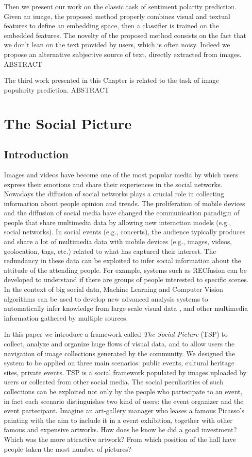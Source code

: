 Then we present our work on the classic task of sentiment polarity prediction. Given an image, the proposed method properly combines visual and textual features to define an embedding space, then a classifier is trained on the embedded features. The novelty of the proposed method consists on the fact that we don't lean on the text provided by users, which is often noisy. Indeed we propose an alternative subjective source of text, directly extracted from images.
ABSTRACT

The third work presented in this Chapter is related to the task of image popularity prediction.
ABSTRACT

\section{The Social Picture}
\subsection{Introduction}
Images and videos have become one of the most popular media by which users express their emotions and share their experiences in the social networks. Nowadays the diffusion of social networks plays a crucial role in collecting information about people opinion and trends.
The proliferation of mobile devices and the diffusion of social media have changed the communication paradigm of people that share multimedia data by allowing new interaction models (e.g., social networks). In social events (e.g., concerts), the audience typically produces and share a lot of multimedia data with mobile devices (e.g., images, videos, geolocation, tags, etc.) related to what has captured their interest. The redundancy in these data can be exploited to infer social information about the attitude of the attending people. For example, systems such as RECfusion \cite{Ortis2015n525} can be developed to understand if there are groups of people interested to specific scenes. In the context of big social data, Machine Learning and Computer Vision algorithms can be used to develop new advanced analysis systems to automatically infer knowledge from large scale visual data \cite{weyand2015visual}, and other multimedia information gathered by multiple sources.

In this paper we introduce a framework called \textit{The Social Picture} (TSP) to collect, analyze and organize huge flows of visual data, and to allow users the navigation of image collections generated by the community.
We designed the system to be applied on three main scenarios: public events, cultural heritage sites, private events. TSP is a social framework populated by images uploaded by users or collected from other social media. The social peculiarities of such collections can be exploited not only by the people who partecipate to an event, in fact each scenario distinguishes two kind of users: the event organizer and the event partecipant.
Imagine an art-gallery manager who leases a famous Picasso's painting with the aim to include it in a event exhibition, together with other famous and expensive artworks. How does he know he did a good investment? Which was the more attractive artwork? From which position of the hall have people taken the most number of pictures?

